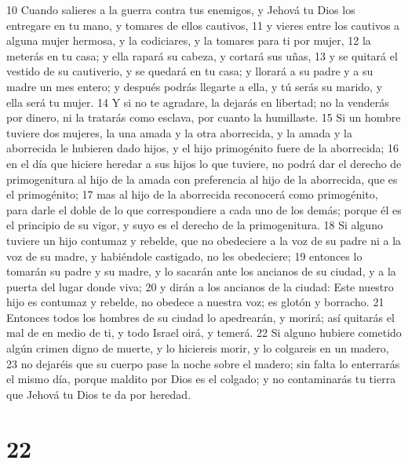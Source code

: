 10 Cuando salieres a la guerra contra tus enemigos, y Jehová tu Dios los entregare en tu mano, y tomares de ellos cautivos,
11 y vieres entre los cautivos a alguna mujer hermosa, y la codiciares, y la tomares para ti por mujer,
12 la meterás en tu casa; y ella rapará su cabeza, y cortará sus uñas,
13 y se quitará el vestido de su cautiverio, y se quedará en tu casa; y llorará a su padre y a su madre un mes entero; y después podrás llegarte a ella, y tú serás su marido, y ella será tu mujer.
14 Y si no te agradare, la dejarás en libertad; no la venderás por dinero, ni la tratarás como esclava, por cuanto la humillaste.
15 Si un hombre tuviere dos mujeres, la una amada y la otra aborrecida, y la amada y la aborrecida le hubieren dado hijos, y el hijo primogénito fuere de la aborrecida;
16 en el día que hiciere heredar a sus hijos lo que tuviere, no podrá dar el derecho de primogenitura al hijo de la amada con preferencia al hijo de la aborrecida, que es el primogénito;
17 mas al hijo de la aborrecida reconocerá como primogénito, para darle el doble de lo que correspondiere a cada uno de los demás; porque él es el principio de su vigor, y suyo es el derecho de la primogenitura.
18 Si alguno tuviere un hijo contumaz y rebelde, que no obedeciere a la voz de su padre ni a la voz de su madre, y habiéndole castigado, no les obedeciere;
19 entonces lo tomarán su padre y su madre, y lo sacarán ante los ancianos de su ciudad, y a la puerta del lugar donde viva;
20 y dirán a los ancianos de la ciudad: Este nuestro hijo es contumaz y rebelde, no obedece a nuestra voz; es glotón y borracho.
21 Entonces todos los hombres de su ciudad lo apedrearán, y morirá; así quitarás el mal de en medio de ti, y todo Israel oirá, y temerá.
22 Si alguno hubiere cometido algún crimen digno de muerte, y lo hiciereis morir, y lo colgareis en un madero,
23 no dejaréis que su cuerpo pase la noche sobre el madero; sin falta lo enterrarás el mismo día, porque maldito por Dios es el colgado; y no contaminarás tu tierra que Jehová tu Dios te da por heredad.

\chapter{22}


